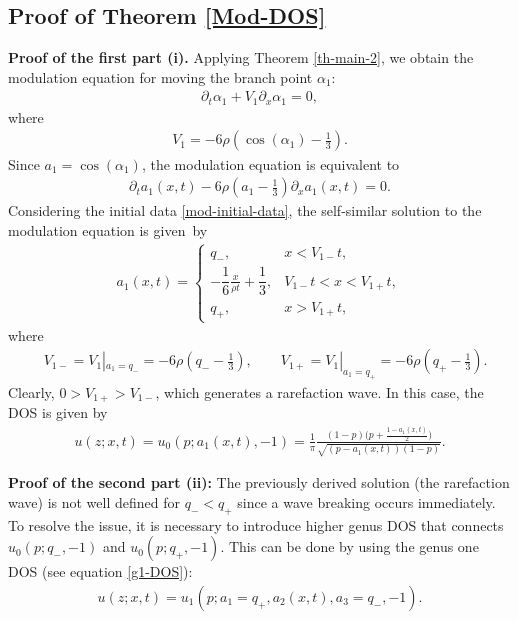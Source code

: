 \documentclass[10pt,a4paper]{amsart}
\numberwithin{equation}{section}
\begin{document}
\subsection{Proof of Theorem \ref{Mod-DOS}}

\textbf{Proof of the first part (i).} Applying Theorem \ref{th-main-2}, we obtain the modulation equation for moving the branch point $\alpha_1$:
\begin{align*}
\partial_t\alpha_1+V_1\partial_x\alpha_1=0,
\end{align*}
where
\begin{align*}
V_1 =-6\rho\left(\cos(\alpha_1)-\frac{1}{3}\right).%
\end{align*}
Since $a_1=\cos(\alpha_1)$, the modulation equation is equivalent to
\begin{align*}
\partial_t a_1(x,t)-6\rho\left(a_1-\frac{1}{3}\right)\partial_x a_1(x,t)=0.
\end{align*}
Considering the initial data \eqref{mod-initial-data}, the self-similar solution to the modulation equation is given~by
\begin{align*}
a_1(x,t)=\begin{cases}
q_-,& x<V_{1-}t,\\
-\dfrac{1}{6}\frac{x}{\rho t}+\dfrac{1}{3},& V_{1-}t<x<V_{1+}t,\\
q_+,& x>V_{1+}t,
\end{cases}
\end{align*}
where
\begin{align*}
&V_{1-}=V_1|_{a_1=q_-}=-6\rho\left(q_--\frac{1}{3}\right),\qquad V_{1+}=V_1|_{a_1=q_+}=-6\rho\left(q_+-\frac{1}{3}\right).
\end{align*}
Clearly, $0>V_{1+}>V_{1-}$, which generates a rarefaction wave. In this case, the DOS is given by
\begin{align*}
u(z;x,t)=u_0(p;a_1(x,t),-1)=\frac{1}{\pi}\frac{(1-p)\bigl(p+\frac{1-a_1(x,t)}{2}\bigr)}{\sqrt{(p-a_1(x,t))(1-p)}}.
\end{align*}



\textbf{Proof of the second part (ii):} The previously derived solution (the rarefaction wave) is not well defined for $q_-<q_+$ since a wave breaking occurs immediately. To resolve the issue, it is necessary to introduce higher genus DOS that connects $u_0(p;q_-,-1)$ and $u_0(p;q_+,-1)$. This can be done by using the genus one DOS (see equation \eqref{g1-DOS}):
\begin{align*}
u(z;x,t)=u_1(p;a_1=q_+,a_2(x,t),a_3=q_-,-1).
\end{align*}
\end{document}
